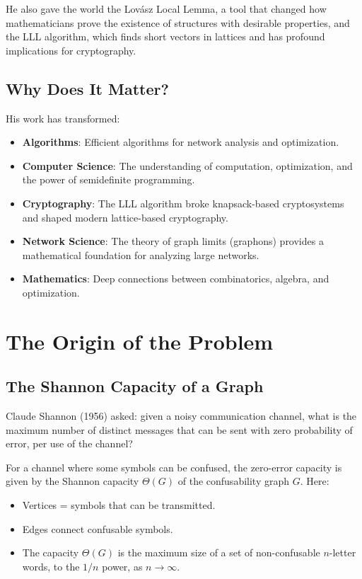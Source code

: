 He also gave the world the Lov\'asz Local Lemma, a tool that changed how mathematicians prove the existence of structures with desirable properties, and the LLL algorithm, which finds short vectors in lattices and has profound implications for cryptography.

\subsection{Why Does It Matter?}

His work has transformed:
\begin{itemize}
\item \textbf{Algorithms}: Efficient algorithms for network analysis and optimization.
\item \textbf{Computer Science}: The understanding of computation, optimization, and the power of semidefinite programming.
\item \textbf{Cryptography}: The LLL algorithm broke knapsack-based cryptosystems and shaped modern lattice-based cryptography.
\item \textbf{Network Science}: The theory of graph limits (graphons) provides a mathematical foundation for analyzing large networks.
\item \textbf{Mathematics}: Deep connections between combinatorics, algebra, and optimization.
\end{itemize}

\section{The Origin of the Problem}

\subsection{The Shannon Capacity of a Graph}

Claude Shannon (1956) asked: given a noisy communication channel, what is the maximum number of distinct messages that can be sent with zero probability of error, per use of the channel?

For a channel where some symbols can be confused, the zero-error capacity is given by the Shannon capacity $\Theta(G)$ of the confusability graph $G$. Here:
\begin{itemize}
\item Vertices = symbols that can be transmitted.
\item Edges connect confusable symbols.
\item The capacity $\Theta(G)$ is the maximum size of a set of non-confusable $n$-letter words, to the $1/n$ power, as $n \to \infty$.
\end{itemize}

